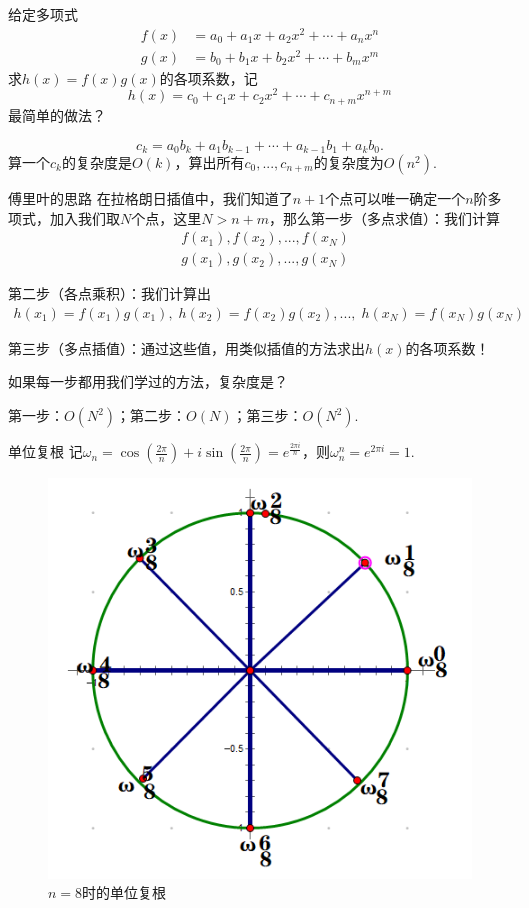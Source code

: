 \documentclass{beamer}
\begin{document}
\begin{frame}
    给定多项式
    \begin{align*}
        f(x) &= a_0 + a_1x + a_2x^2 + \cdots + a_nx^n\\
        g(x) &= b_0 + b_1x + b_2x^2 + \cdots + b_mx^m
    \end{align*}
    求$h(x)=f(x)g(x)$的各项系数，记
    \begin{equation*}
        h(x) = c_0 + c_1x + c_2x^2 + \cdots  + c_{n+m}x^{n+m}
    \end{equation*}
    最简单的做法？
    \pause

    \begin{equation*}
        c_k=a_0b_k + a_1b_{k-1} + \cdots  + a_{k-1}b_1 + a_kb_0.
    \end{equation*}
    算一个$c_k$的复杂度是$O(k)$，算出所有$c_0,...,c_{n+m}$的复杂度为$O(n^2)$.
\end{frame}

\begin{frame}{傅里叶的思路}
    在拉格朗日插值中，我们知道了$n+1$个点可以唯一确定一个$n$阶多项式，加入我们取$N$个点，这里$N>n+m$，那么第一步（多点求值）：我们计算
    \begin{align*}
        & f(x_1), f(x_2), ..., f(x_N)\\
        & g(x_1), g(x_2), ..., g(x_N)
    \end{align*}

    第二步（各点乘积）：我们计算出
    \begin{align*}
        h(x_1)=f(x_1)g(x_1),\;h(x_2)=f(x_2)g(x_2),...,\;h(x_N)=f(x_N)g(x_N)
    \end{align*}

    第三步（多点插值）：通过这些值，用类似插值的方法求出$h(x)$的各项系数！

    如果每一步都用我们学过的方法，复杂度是？
    \pause

    \vspace{1em}
    第一步：$O(N^2)$；第二步：$O(N)$；第三步：$O(N^2)$.
\end{frame}

\begin{frame}{单位复根}
    记$\omega_n=\cos\left(\frac{2\pi}{n}\right)+i\sin\left(\frac{2\pi}{n}\right)=e^{\frac{2\pi i}{n}}$，则$\omega_n^n=e^{2\pi i}=1$.

    \begin{figure}
        \centering
        \includegraphics[width=0.5\linewidth]{pic/unitroot.png}
        \caption{$n=8$时的单位复根}
    \end{figure}
\end{frame}
\end{document}
